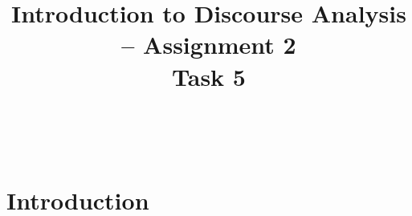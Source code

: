 \documentclass[11pt]{article}
\title{\LARGE Introduction to Discourse Analysis -- Assignment 2 \\ Task 5}
\date{}
\author{}
\begin{document}
\maketitle

\,
\vspace{-5em}






\section*{Introduction}{

}

\end{document}

